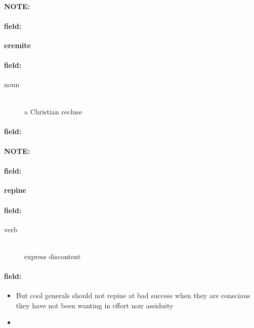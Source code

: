 \documentclass[12pt]{article}
\newenvironment{note}{\paragraph{NOTE:}}{}
\newenvironment{field}{\paragraph{field:}}{}
\begin{document}
\begin{note}
\begin{field}
\textbf{\large eremite}
\end{field}


\begin{field}
\begin{description}
\item[noun] \hfill \\ 
a Christian recluse

\end{description}
\end{field}

\begin{field}
\end{field}
\end{note}
\begin{note}
\begin{field}
\textbf{\large repine}
\end{field}


\begin{field}
\begin{description}
\item[verb] \hfill \\ 
express discontent

\end{description}
\end{field}

\begin{field}
\begin{itemize}
\item But cool generals should not repine at bad success when they are conscious they have not been wanting in effort noir assiduity
\item 
\end{itemize}
\end{field}
\end{note}
\end{document}
